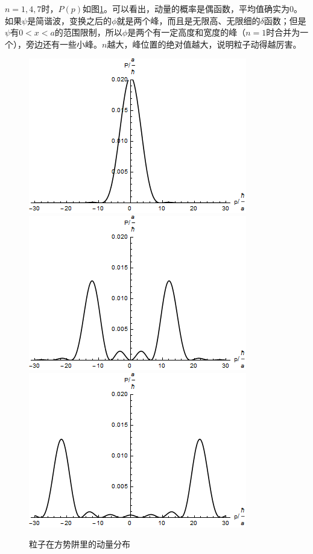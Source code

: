 $n=1,4,7$时，$P(p)$如图\ref{fig-square-well-p}。可以看出，动量的概率是偶函数，平均值确实为$0$。如果$\psi$是简谐波，变换之后的$\phi$就是两个峰，而且是无限高、无限细的$\delta$函数；但是$\psi$有$0<x<a$的范围限制，所以$\phi$是两个有一定高度和宽度的峰（$n=1$时合并为一个），旁边还有一些小峰。$n$越大，峰位置的绝对值越大，说明粒子动得越厉害。
\begin{figure}[htb]
\centering
\includegraphics[scale=0.4]{fig/square-well-p}
\includegraphics[scale=0.4]{fig/square-well-p-4}
\includegraphics[scale=0.4]{fig/square-well-p-7}
\caption{粒子在方势阱里的动量分布}
\label{fig-square-well-p}
\end{figure}

